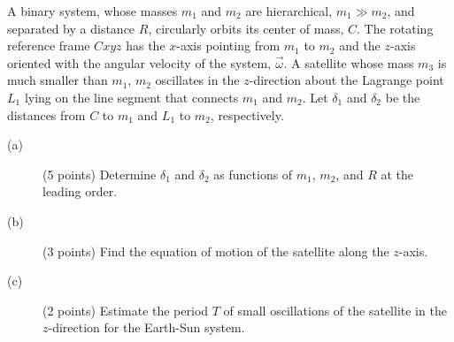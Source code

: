 A binary system, whose masses $m_1$ and $m_2$ are hierarchical,
$m_1 \gg m_2$, and separated by a distance $R$, circularly orbits its center
of mass, $C$. The rotating reference frame $Cxyz$ has the $x$-axis pointing
from $m_1$ to $m_2$ and the $z$-axis oriented with the angular velocity of
the system, $\vec{\omega}$. A satellite whose mass $m_3$ is much smaller than
$m_1$, $m_2$ oscillates in the $z$-direction about the Lagrange point $L_1$
lying on the line segment that connects $m_1$ and $m_2$. Let $\delta_1$ and
$\delta_2$ be the distances from $C$ to $m_1$ and $L_1$ to $m_2$,
respectively.


\begin{description}
\item[(a)] (5 points) Determine $\delta_1$ and $\delta_2$ as functions of
  $m_1$, $m_2$, and $R$ at the leading order.
\item[(b)] (3 points) Find the equation of motion of the satellite along the
  $z$-axis.
\item[(c)] (2 points) Estimate the period $T$ of small oscillations of the
  satellite in the $z$-direction for the Earth-Sun system.
\end{description}
